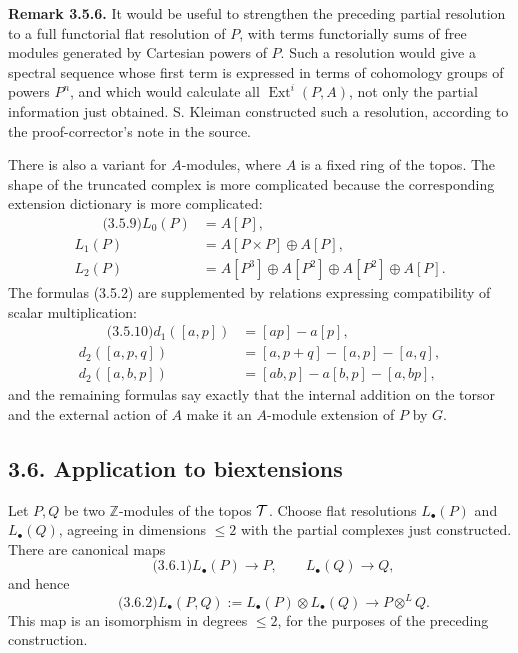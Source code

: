 \documentclass[11pt]{article}
\providecommand{\Z}{\mathbb Z}
\providecommand{\Ext}{\operatorname{Ext}}
\begin{document}
\textbf{Remark 3.5.6.}  It would be useful to strengthen the preceding partial resolution to a full functorial flat resolution of \(P\), with terms functorially sums of free modules generated by Cartesian powers of \(P\).  Such a resolution would give a spectral sequence whose first term is expressed in terms of cohomology groups of powers \(P^n\), and which would calculate all \(\Ext^i(P,A)\), not only the partial information just obtained.  S. Kleiman constructed such a resolution, according to the proof-corrector's note in the source.

There is also a variant for \(A\)-modules, where \(A\) is a fixed ring of the topos.  The shape of the truncated complex is more complicated because the corresponding extension dictionary is more complicated:
\begin{align}\qquad\text{(3.5.9)}
L_0(P)&=A[P],\\
L_1(P)&=A[P\times P]\oplus A[P],\\
L_2(P)&=A[P^3]\oplus A[P^2]\oplus A[P^2]\oplus A[P].
\end{align}
The formulas (3.5.2) are supplemented by relations expressing compatibility of scalar multiplication:
\begin{align}\qquad\text{(3.5.10)}
 d_1([a,p])&=[ap]-a[p],\\
 d_2([a,p,q])&=[a,p+q]-[a,p]-[a,q],\\
 d_2([a,b,p])&=[ab,p]-a[b,p]-[a,bp],
\end{align}
and the remaining formulas say exactly that the internal addition on the torsor and the external action of \(A\) make it an \(A\)-module extension of \(P\) by \(G\).

\subsection*{3.6. Application to biextensions}
Let \(P,Q\) be two \(\Z\)-modules of the topos \(\mathcal T\).  Choose flat resolutions \(L_\bullet(P)\) and \(L_\bullet(Q)\), agreeing in dimensions \(\leq2\) with the partial complexes just constructed.  There are canonical maps
\begin{equation}\qquad\text{(3.6.1)}
  L_\bullet(P)\to P,
  \qquad
  L_\bullet(Q)\to Q,
\end{equation}
and hence
\begin{equation}\qquad\text{(3.6.2)}
  L_\bullet(P,Q):=L_\bullet(P)\otimes L_\bullet(Q)
  \longrightarrow P\otimes^{L}Q.
\end{equation}
This map is an isomorphism in degrees \(\leq2\), for the purposes of the preceding construction.
\end{document}
